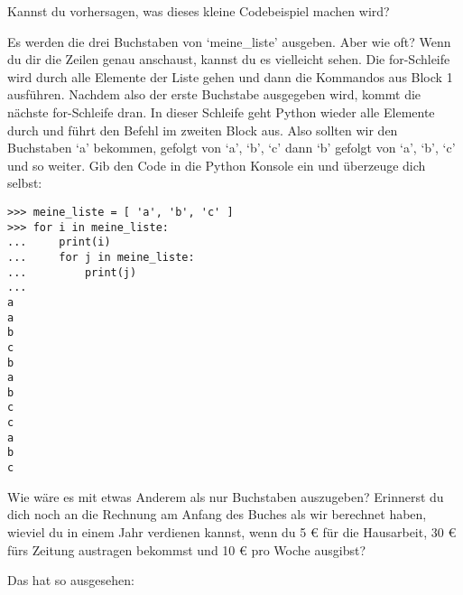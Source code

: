 Kannst du vorhersagen, was dieses kleine Codebeispiel machen wird?
\par
Es werden die drei Buchstaben von `meine\_liste' ausgeben. Aber wie oft? Wenn du dir die Zeilen genau anschaust, kannst du es vielleicht sehen. Die for-Schleife wird durch alle Elemente der Liste gehen und dann die Kommandos aus Block 1 ausführen. Nachdem also der erste Buchstabe ausgegeben wird, kommt die nächste for-Schleife dran. In dieser Schleife geht Python wieder alle Elemente durch und führt den Befehl im zweiten Block aus. Also sollten wir den Buchstaben `a' bekommen, gefolgt von `a', `b', `c' dann `b' gefolgt von `a', `b', `c' und so weiter. Gib den Code in die Python Konsole ein und überzeuge dich selbst:

\begin{Verbatim}[frame=single]
>>> meine_liste = [ 'a', 'b', 'c' ]
>>> for i in meine_liste:
...     print(i)
...     for j in meine_liste:
...         print(j)
...
a
a
b
c
b
a
b
c
c
a
b
c
\end{Verbatim}


Wie wäre es mit etwas Anderem als nur Buchstaben auszugeben? Erinnerst du dich noch an die Rechnung am Anfang des Buches als wir berechnet haben, wieviel du in einem Jahr verdienen kannst, wenn du 5 € für die Hausarbeit, 30 € fürs Zeitung austragen bekommst und 10 € pro Woche ausgibst?
\par
\noindent
Das hat so ausgesehen:

